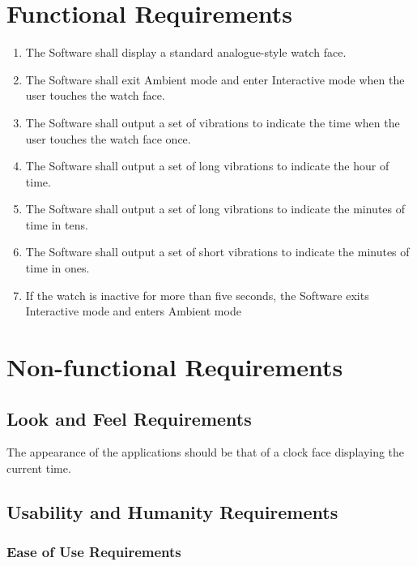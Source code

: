 \documentclass[12pt, titlepage]{article}
\begin{document}
\section{Functional Requirements}
\begin{enumerate}

\item The Software shall display a standard analogue-style watch face.

\item The Software shall exit Ambient mode and enter Interactive mode when the user touches the watch face.

\item The Software shall output a set of vibrations to indicate the time when the user touches the watch face once. 

\item The Software shall output a set of long vibrations to indicate the hour of time.

\item The Software shall output a set of long vibrations to indicate the minutes of time in tens.

\item The Software shall output a set of short vibrations to indicate the minutes of time in ones. 

\item If the watch is inactive for more than five seconds, the Software exits Interactive mode and enters Ambient mode

\end{enumerate}

\section{Non-functional Requirements}

\subsection{Look and Feel Requirements}

The appearance of the applications should be that of a clock face displaying the current time.

\subsection{Usability and Humanity Requirements}

\subsubsection{Ease of Use Requirements}
\end{document}
